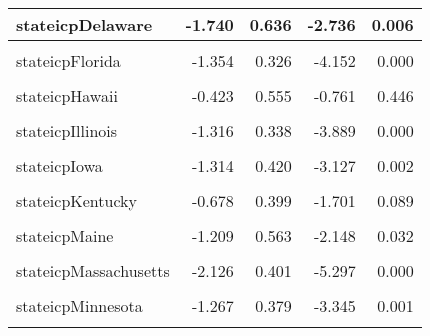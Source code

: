\documentclass[
]{article}
\begin{document}
\begin{table}
\begin{tabular}[t]{l|r|r|r|r}
\hline
stateicpDelaware & -1.740 & 0.636 & -2.736 & 0.006\\
\hline
\cellcolor{gray!6}{stateicpDistrict Of Columbia} & \cellcolor{gray!6}{-1.971} & \cellcolor{gray!6}{1.185} & \cellcolor{gray!6}{-1.663} & \cellcolor{gray!6}{0.096}\\
\hline
stateicpFlorida & -1.354 & 0.326 & -4.152 & 0.000\\
\hline
\cellcolor{gray!6}{stateicpGeorgia} & \cellcolor{gray!6}{-0.901} & \cellcolor{gray!6}{0.350} & \cellcolor{gray!6}{-2.573} & \cellcolor{gray!6}{0.010}\\
\hline
stateicpHawaii & -0.423 & 0.555 & -0.761 & 0.446\\
\hline
\cellcolor{gray!6}{stateicpIdaho} & \cellcolor{gray!6}{-0.601} & \cellcolor{gray!6}{0.520} & \cellcolor{gray!6}{-1.155} & \cellcolor{gray!6}{0.248}\\
\hline
stateicpIllinois & -1.316 & 0.338 & -3.889 & 0.000\\
\hline
\cellcolor{gray!6}{stateicpIndiana} & \cellcolor{gray!6}{-1.294} & \cellcolor{gray!6}{0.366} & \cellcolor{gray!6}{-3.534} & \cellcolor{gray!6}{0.000}\\
\hline
stateicpIowa & -1.314 & 0.420 & -3.127 & 0.002\\
\hline
\cellcolor{gray!6}{stateicpKansas} & \cellcolor{gray!6}{-0.876} & \cellcolor{gray!6}{0.427} & \cellcolor{gray!6}{-2.053} & \cellcolor{gray!6}{0.040}\\
\hline
stateicpKentucky & -0.678 & 0.399 & -1.701 & 0.089\\
\hline
\cellcolor{gray!6}{stateicpLouisiana} & \cellcolor{gray!6}{-1.075} & \cellcolor{gray!6}{0.451} & \cellcolor{gray!6}{-2.383} & \cellcolor{gray!6}{0.017}\\
\hline
stateicpMaine & -1.209 & 0.563 & -2.148 & 0.032\\
\hline
\cellcolor{gray!6}{stateicpMaryland} & \cellcolor{gray!6}{-1.624} & \cellcolor{gray!6}{0.399} & \cellcolor{gray!6}{-4.069} & \cellcolor{gray!6}{0.000}\\
\hline
stateicpMassachusetts & -2.126 & 0.401 & -5.297 & 0.000\\
\hline
\cellcolor{gray!6}{stateicpMichigan} & \cellcolor{gray!6}{-1.386} & \cellcolor{gray!6}{0.342} & \cellcolor{gray!6}{-4.051} & \cellcolor{gray!6}{0.000}\\
\hline
stateicpMinnesota & -1.267 & 0.379 & -3.345 & 0.001\\
\hline
\cellcolor{gray!6}{stateicpMississippi} & \cellcolor{gray!6}{-0.652} & \cellcolor{gray!6}{0.511} & \cellcolor{gray!6}{-1.276} & \cellcolor{gray!6}{0.202}\\

\end{tabular}
\end{table}
\end{document}
